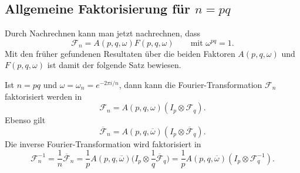 %
%
%

%
%
\subsection{Allgemeine Faktorisierung für $n=pq$}
Durch Nachrechnen kann man jetzt nachrechnen, dass
\[
\mathscr{F}_n = A(p,q,\omega) F(p,q,\omega)
\qquad\text{mit $\omega^{pq}=1$}.
\]
Mit den früher gefundenen Resultaten über die beiden Faktoren
$A(p,q,\omega)$ und $F(p,q,\omega)$ ist damit der folgende
Satz bewiesen.

\begin{satz}
\label{buch:diskret:vandermonde:satz:fourierfaktorisierung}
Ist $n=pq$ und $\omega=\omega_n=e^{-2\pi i/n}$,
dann kann die Fourier-Transformation $\mathscr{F}_n$
faktorisiert werden in
\[
\mathscr{F}_n
=
A(p,q,\omega)
(I_p\otimes \mathscr{F}_q).
\]
Ebenso gilt
\[
\overline{\mathscr{F}}_n
=
A(p,q,\overline{\omega})
(I_p\otimes \overline{\mathscr{F}}_q).
\]
Die inverse Fourier-Transformation wird faktorisiert in
\[
\mathscr{F}_n^{-1}
=
\frac{1}{n}\overline{\mathscr{F}}_n
=
\frac{1}{p} A(p,q,\overline{\omega})
\biggl(I_p \otimes \frac1q\overline{\mathscr{F}}_q\biggr)
=
\frac{1}{p} A(p,q,\overline{\omega})
(I_p\otimes \mathscr{F}_q^{-1}).
\]
\end{satz}

